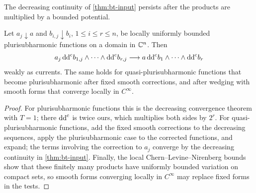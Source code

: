 The decreasing continuity of \cref{thm:bt-input} persists after the products are multiplied by a bounded potential.

\begin{lemma}\label{lem:weighted-decreasing-products}
Let $a_j\downarrow a$ and $b_{i,j}\downarrow b_i$, $1\leq i\leq r\leq n$, be locally uniformly bounded plurisubharmonic functions on a domain in $\mathbb C^n$. Then
\[
 a_j\,\mathrm{dd}^{\mathrm{c}} b_{1,j}\wedge\cdots\wedge\mathrm{dd}^{\mathrm{c}} b_{r,j}
 \longrightarrow a\,\mathrm{dd}^{\mathrm{c}} b_1\wedge\cdots\wedge\mathrm{dd}^{\mathrm{c}} b_r
\]
weakly as currents. The same holds for quasi-plurisubharmonic functions that become plurisubharmonic after fixed smooth corrections, and after wedging with smooth forms that converge locally in $C^\infty$.
\end{lemma}
\begin{proof}
For plurisubharmonic functions this is the decreasing convergence theorem \cite[Theorem~3.18]{GZ17} with $T=1$; there $\mathrm{dd}^{\mathrm{c}}$ is twice ours, which multiplies both sides by $2^r$. For quasi-plurisubharmonic functions, add the fixed smooth corrections to the decreasing sequences, apply the plurisubharmonic case to the corrected functions, and expand; the terms involving the correction to $a_j$ converge by the decreasing continuity in \cref{thm:bt-input}. Finally, the local Chern--Levine--Nirenberg bounds show that these finitely many products have uniformly bounded variation on compact sets, so smooth forms converging locally in $C^\infty$ may replace fixed forms in the tests.
\end{proof}
